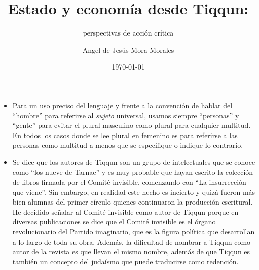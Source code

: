 \documentclass{scrbook}
\title{Estado y economía desde Tiqqun:}
\subtitle{perspectivas de acción crítica}
\author{Angel de Jesús Mora Morales}
\date{\today}
\begin{document}
\frontmatter
\maketitle


\begin{itemize}
\tightlist
\item
  Para un uso preciso del lenguaje y frente a la convención de hablar
  del ``hombre'' para referirse al \emph{sujeto} universal, usamos
  siempre ``personas'' y ``gente'' para evitar el plural masculino como
  plural para cualquier multitud. En todos los casos donde se lee plural
  en femenino es para referirse a las personas como multitud a menos que
  se especifique o indique lo contrario.
\item
  Se dice que los autores de Tiqqun son un grupo de intelectuales que se
  conoce como ``los nueve de Tarnac'' y es muy probable que hayan
  escrito la colección de libros firmada por el Comité invisible,
  comenzando con ``La insurrección que viene''. Sin embargo, en realidad
  este hecho es incierto y quizá fueron más bien alumnas del primer
  círculo quienes continuaron la producción escritural. He decidido
  señalar al Comité invisible como autor de Tiqqun porque en diversas
  publicaciones se dice que el Comité invisible es el órgano
  revolucionario del Partido imaginario, que es la figura política que
  desarrollan a lo largo de toda su obra. Además, la dificultad de
  nombrar a Tiqqun como autor de la revista es que llevan el mismo
  nombre, además de que Tiqqun es también un concepto del judaísmo que
  puede traducirse como redención.
\end{itemize}

\end{document}
